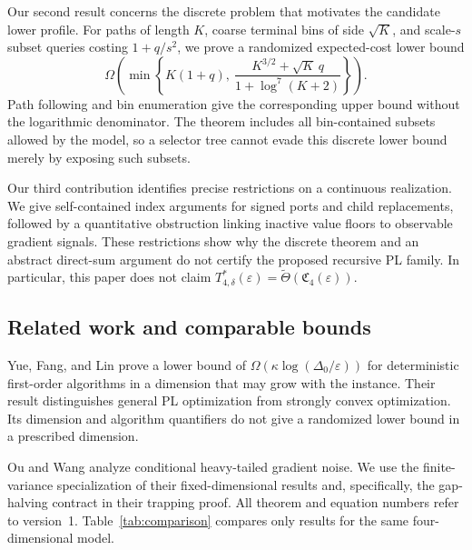 \documentclass[11pt,a4paper]{article}
\newcommand{\eps}{\varepsilon}
\newcommand{\tTheta}{\widetilde\Theta}
\newcommand{\profile}{\mathfrak C_4}
\theoremstyle{definition}
\theoremstyle{remark}
\begin{document}
Our second result concerns the discrete problem that motivates the
candidate lower profile.  For paths of length $K$, coarse terminal
bins of side $\sqrt K$, and scale-$s$ subset queries costing
$1+q/s^2$, we prove a randomized expected-cost lower bound
\[
 \Omega\!\left(
 \min\left\{K(1+q),\
 \frac{K^{3/2}+\sqrt K\,q}{1+\log^7(K+2)}\right\}\right).
\]
Path following and bin enumeration give the corresponding upper
bound without the logarithmic denominator.  The theorem includes
all bin-contained subsets allowed by the model, so a selector tree
cannot evade this discrete lower bound merely by exposing such
subsets.

Our third contribution identifies precise restrictions on a
continuous realization.  We give self-contained index arguments for
signed ports and child replacements, followed by a quantitative
obstruction linking inactive value floors to observable gradient
signals.  These restrictions show why the discrete theorem and an
abstract direct-sum argument do not certify the proposed recursive
PL family.  In particular, this paper does not claim
$T^*_{4,\delta}(\eps)=\tTheta(\profile(\eps))$.

\subsection{Related work and comparable bounds}

Yue, Fang, and Lin \cite{yue2023} prove a lower bound of
$\Omega(\kappa\log(\Delta_0/\eps))$ for deterministic first-order
algorithms in a dimension that may grow with the instance.
Their result distinguishes general PL optimization from strongly
convex optimization.  Its dimension and algorithm quantifiers
do not give a randomized lower bound in a prescribed dimension.

Ou and Wang \cite{ouwang2026} analyze conditional heavy-tailed
gradient noise.  We use the finite-variance specialization of their
fixed-dimensional results and, specifically, the gap-halving
contract in their trapping proof.  All theorem and equation
numbers refer to version~1.  Table~\ref{tab:comparison}
compares only results for the same four-dimensional model.
\end{document}
